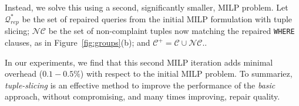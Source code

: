 Instead, we solve this using a second, significantly smaller, MILP problem.   
Let $\mathcal{Q}^*_{rep}$ be the set of repaired queries from the  initial MILP formulation with tuple slicing;
$\mathcal{NC}$ be the set of non-complaint tuples now matching the repaired \texttt{WHERE} clauses, as in Figure~\ref{fig:groups}(b); and $\mathcal{C}^+ = \mathcal{C} \cup \mathcal{NC}$..


In our experiments, we find that this second MILP iteration adds
minimal overhead ($0.1-0.5\%$) with respect to the initial MILP
problem.  To summariez, \emph{tuple-slicing} is an effective method to improve the performance of the \emph{basic} approach, without compromising, and many times improving, repair quality.



